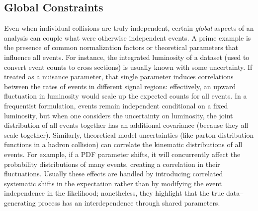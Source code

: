     \subsection{Global Constraints}
        Even when individual collisions are truly independent, certain \emph{global} aspects of an analysis can couple what were otherwise independent events.
        A prime example is the presence of common normalization factors or theoretical parameters that influence all events.
        For instance, the integrated luminosity of a dataset (used to convert event counts to cross sections) is usually known with some uncertainty.
        If treated as a nuisance parameter, that single parameter induces correlations between the rates of events in different signal regions: effectively, an upward fluctuation in luminosity would scale up the expected counts for all events.
        In a frequentist formulation, events remain independent conditional on a fixed luminosity, but when one considers the uncertainty on luminosity, the joint distribution of all events together has an additional covariance (because they all scale together).
        Similarly, theoretical model uncertainties (like parton distribution functions in a hadron collision) can correlate the kinematic distributions of all events.
        For example, if a PDF parameter shifts, it will concurrently affect the probability distributions of many events, creating a correlation in their fluctuations.
        Usually these effects are handled by introducing correlated systematic shifts in the expectation rather than by modifying the event independence in the likelihood;
        nonetheless, they highlight that the true data--generating process has an interdependence through shared parameters.
        
